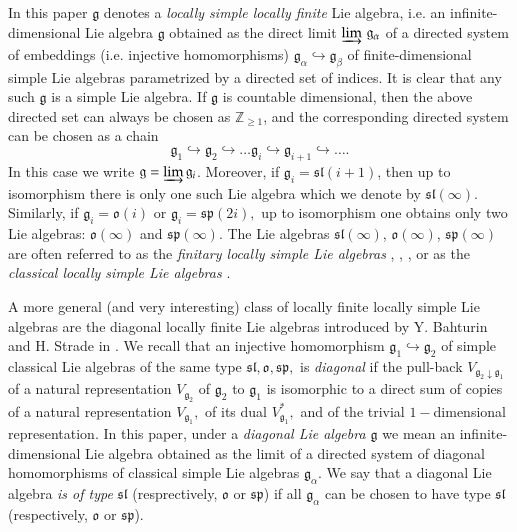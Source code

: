 \documentclass[10pt]{amsart}
\newcommand {\ZZ} {\mathbb {Z}}
\renewcommand{\sp}{\mathfrak{sp}}
\renewcommand{\sl}{\mathfrak{sl}}
\newcommand{\oo}{\mathfrak{o}}
\renewcommand{\gg}{\mathfrak{g}}
\begin{document}
In this paper $\gg$ denotes a \textit{locally simple locally finite} Lie algebra, i.e. an infinite-dimensional Lie algebra $\gg$ 
obtained as the direct limit $\varinjlim\,\gg_\alpha$ of a directed system of embeddings (i.e. injective homomorphisms) $\gg_\alpha \hookrightarrow\gg_\beta$
of finite-dimensional simple Lie algebras parametrized by a directed set of indices. It is clear that any such $\gg$ is a simple Lie algebra.
If $\gg$ is countable dimensional, then the above directed set can always be chosen as $\ZZ_{\geq 1}$, and the corresponding directed system can be chosen as a chain 
\begin{equation}\label{def_gg}
 \gg_1 \hookrightarrow \gg_2 \hookrightarrow \dots \gg_i \hookrightarrow \gg_{i+1} \hookrightarrow \dots.
\end{equation}
In this case we write
$\gg=\varinjlim \gg_i$. Moreover, if $\gg_i = \sl(i+1)$, then up to isomorphism there is only one such Lie algebra which we denote by $\sl(\infty)$. Similarly, if $\gg_i = \oo(i)$ or $\gg_i = \sp(2i),$ up to isomorphism one obtains only two Lie algebras: $\oo(\infty)$ and $\sp(\infty)$. The Lie algebras $\sl(\infty)$,  $\oo(\infty)$,  $\sp(\infty)$ are often referred to as the \textit{finitary locally simple Lie algebras} \cite{BA1}, \cite{BA2}, \cite{BS}, or as the \textit{classical locally simple Lie algebras} \cite{ps}. 

A more general (and very interesting) class of locally finite locally simple  Lie algebras are the diagonal locally finite Lie algebras introduced by Y. Bahturin and H. Strade in \cite{BHS}.
We recall that an injective homomorphism $\gg_1 \hookrightarrow \gg_2$ of simple classical Lie algebras of the same type $\sl, \oo, \sp,$ is \textit{diagonal} if the pull-back $V_{\gg_2\downarrow\gg_1}$ of a natural representation $V_{\gg_2}$ of $\gg_2$ to $\gg_1$ is isomorphic to a direct sum of copies of a natural representation $V_{\gg_1},$ of its dual $V_{\gg_1}^*,$ and of the trivial $1-$dimensional representation. In this paper, under a \textit{diagonal Lie algebra $\gg$} we mean an infinite-dimensional Lie 
algebra obtained as the limit of a directed system of diagonal homomorphisms of classical simple Lie algebras $\gg_\alpha$. We say that a diagonal Lie algebra \textit{is of type} $\sl$ (resprectively, $\oo$ or $\sp$) if all $\gg_\alpha$ can be chosen to have type $\sl$ (respectively, $\oo$ or $\sp$). 
\end{document}
